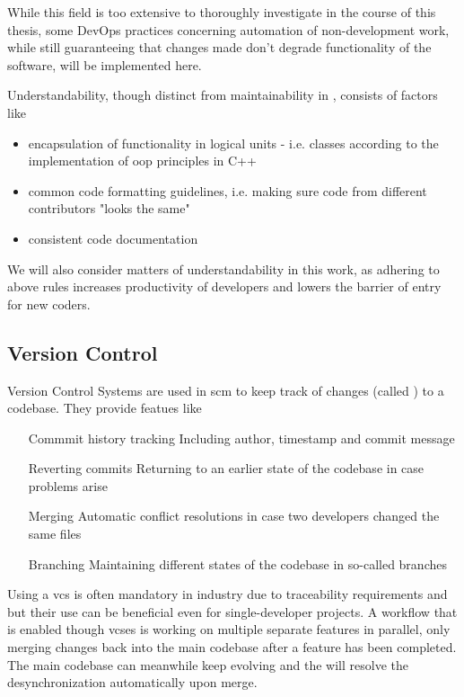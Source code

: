 While this field is too extensive to thoroughly investigate in the course of this thesis, some DevOps practices concerning automation of non-development work, while still guaranteeing that changes made don't degrade functionality of the software, will be implemented here. 

Understandability, though distinct from maintainability in \citet{Bray1997}, consists of factors like 
\begin{itemize}
	\item encapsulation of functionality in logical units - i.e. classes according to the implementation of \gls{oop} principles in C++
	\item common code formatting guidelines, i.e. making sure code from different contributors "looks the same"
	\item consistent code documentation
\end{itemize}
We will also consider matters of understandability in this work, as adhering to above rules increases productivity of developers and lowers the barrier of entry for new coders.

\subsection{Version Control}
\gls{Version Control System}s  are used in \gls{scm} to keep track of changes (called ) to a codebase. They provide featues like
\begin{itemize}
	\item[Commmit history tracking] Including author, timestamp and commit message 
	\item[Reverting commits] Returning to an earlier state of the codebase in case problems arise
	\item[Merging] Automatic conflict resolutions in case two developers changed the same files
	\item[Branching] Maintaining different states of the codebase in so-called branches
\end{itemize}

Using a \gls{vcs} is often mandatory in industry due to traceability requirements and but their use can be beneficial even for single-developer projects. A workflow that is enabled though \gls{vcs}es is working on multiple separate features in parallel, only merging changes back into the main codebase after a feature has been completed. The main codebase can meanwhile keep evolving and the  will resolve the desynchronization automatically upon merge.


